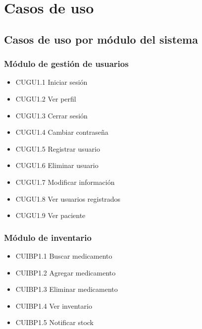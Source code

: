 \documentclass[12pt,letterpaper]{article}
\begin{document}
    \section{Casos de uso}
        \justify
            \subsection{Casos de uso por módulo del sistema}
                \subsubsection{Módulo de gestión de usuarios}
                    \begin{itemize}
                        \item CUGU1.1 Iniciar sesión 
                        \item CUGU1.2 Ver perfil
                        \item CUGU1.3 Cerrar sesión 
                        \item CUGU1.4 Cambiar contraseña 
                        \item CUGU1.5 Registrar usuario 
                        \item CUGU1.6 Eliminar usuario 
                        \item CUGU1.7 Modificar información 
                        \item CUGU1.8 Ver usuarios registrados 
                        \item CUGU1.9 Ver paciente 
                    \end{itemize}
                \subsubsection{Módulo de inventario}
                    \begin{itemize}
                        \item CUIBP1.1 Buscar medicamento 
                        \item CUIBP1.2 Agregar medicamento 
                        \item CUIBP1.3 Eliminar medicamento 
                        \item CUIBP1.4 Ver inventario 
                        \item CUIBP1.5 Notificar stock 
                    \end{itemize}
\end{document}
